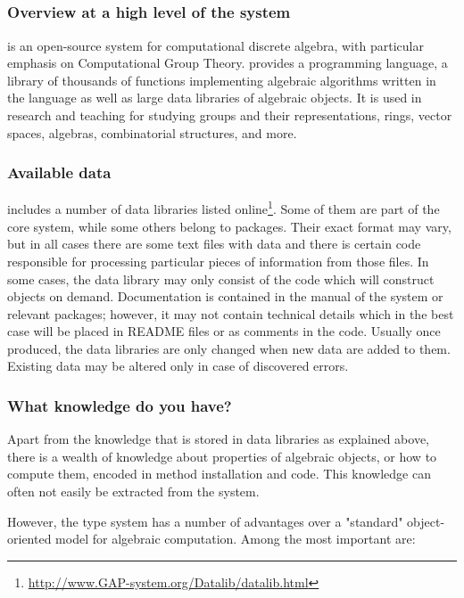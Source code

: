 \subsection{\GAP}
\subsubsection{Overview at a high level of the \GAP system}

\GAP \cite{gap} is an open-source system for computational discrete algebra, with particular emphasis on Computational Group Theory. \GAP provides a programming language, a library of thousands of functions implementing algebraic algorithms written in the \GAP language as well as large data libraries of algebraic objects. It is used in research and teaching for studying groups and their representations, rings, vector spaces, algebras, combinatorial structures, and more.

\subsubsection{Available data}
\GAP includes a number of data libraries listed online\footnote{\url{http://www.GAP-system.org/Datalib/datalib.html}}. Some of them are part of the core \GAP system, while some others belong to \GAP packages. Their exact format may vary, but in all cases there are some text files with data and there is certain code responsible for processing particular pieces of information from those files. In some cases, the data library may only consist of the \GAP code which will construct \GAP objects on demand. Documentation is contained in the manual of the \GAP system or relevant packages; however, it may not contain technical details which in the best case will be placed in README files or as comments in the code. Usually once produced, the data libraries are only changed when new data are added to them. Existing data may be altered only in case of discovered errors.

\subsubsection{What knowledge do you have?}
Apart from the knowledge that is stored in data libraries as explained above, there is a wealth of knowledge about properties of algebraic objects, or how to compute them, encoded in method installation and code. This knowledge can often not easily be extracted from the system.

However, the \GAP type system has a number of advantages over a "standard" object-oriented model for algebraic computation. Among the most important are:

